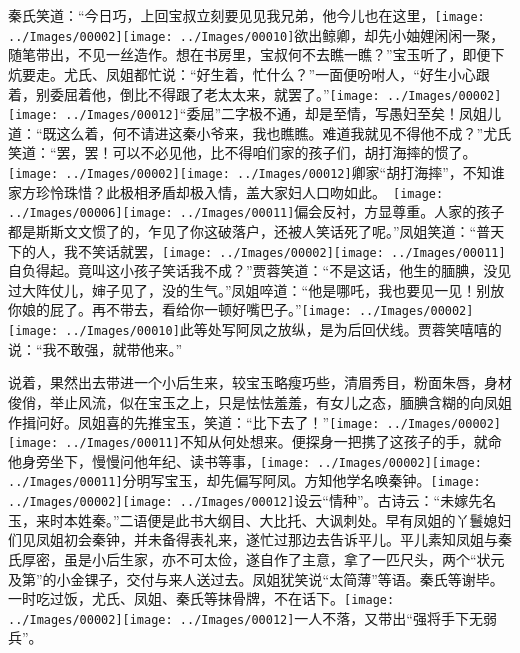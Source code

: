 秦氏笑道：``今日巧，上回宝叔立刻要见见我兄弟，他今儿也在这里，{\texttt{[image: ../Images/00002]}\texttt{[image: ../Images/00010]}\footnotesize \kaishu 欲出鲸卿，却先小妯娌闲闲一聚，随笔带出，不见一丝造作。}想在书房里，宝叔何不去瞧一瞧？''宝玉听了，即便下炕要走。尤氏、凤姐都忙说：``好生着，忙什么？''一面便吩咐人，``好生小心跟着，别委屈着他，倒比不得跟了老太太来，就罢了。''{\texttt{[image: ../Images/00002]}\texttt{[image: ../Images/00012]}\footnotesize \kaishu ``委屈''二字极不通，却是至情，写愚妇至矣！}凤姐儿道：``既这么着，何不请进这秦小爷来，我也瞧瞧。难道我就见不得他不成？''尤氏笑道：``罢，罢！可以不必见他，比不得咱们家的孩子们，胡打海摔的惯了。{{\texttt{[image: ../Images/00002]}\texttt{[image: ../Images/00012]}\footnotesize \kaishu 卿家``胡打海摔''，不知谁家方珍怜珠惜？此极相矛盾却极入情，盖大家妇人口吻如此。　}\texttt{[image: ../Images/00006]}\texttt{[image: ../Images/00011]}\footnotesize \kaishu 偏会反衬，方显尊重。}人家的孩子都是斯斯文文惯了的，乍见了你这破落户，还被人笑话死了呢。''凤姐笑道：``普天下的人，我不笑话就罢，{\texttt{[image: ../Images/00002]}\texttt{[image: ../Images/00011]}\footnotesize \kaishu 自负得起。}竟叫这小孩子笑话我不成？''贾蓉笑道：``不是这话，他生的腼腆，没见过大阵仗儿，婶子见了，没的生气。''凤姐啐道：``他是哪吒，我也要见一见！别放你娘的屁了。再不带去，看给你一顿好嘴巴子。''{\texttt{[image: ../Images/00002]}\texttt{[image: ../Images/00010]}\footnotesize \kaishu 此等处写阿凤之放纵，是为后回伏线。}贾蓉笑嘻嘻的说：``我不敢强，就带他来。''

说着，果然出去带进一个小后生来，较宝玉略瘦巧些，清眉秀目，粉面朱唇，身材俊俏，举止风流，似在宝玉之上，只是怯怯羞羞，有女儿之态，腼腆含糊的向凤姐作揖问好。凤姐喜的先推宝玉，笑道：``比下去了！''{\texttt{[image: ../Images/00002]}\texttt{[image: ../Images/00011]}\footnotesize \kaishu 不知从何处想来。}便探身一把携了这孩子的手，就命他身旁坐下，慢慢问他年纪、读书等事，{\texttt{[image: ../Images/00002]}\texttt{[image: ../Images/00011]}\footnotesize \kaishu 分明写宝玉，却先偏写阿凤。}方知他学名唤秦钟。{\texttt{[image: ../Images/00002]}\texttt{[image: ../Images/00012]}\footnotesize \kaishu 设云``情种''。古诗云：``未嫁先名玉，来时本姓秦。''二语便是此书大纲目、大比托、大讽刺处。}早有凤姐的丫鬟媳妇们见凤姐初会秦钟，并未备得表礼来，遂忙过那边去告诉平儿。平儿素知凤姐与秦氏厚密，虽是小后生家，亦不可太俭，遂自作了主意，拿了一匹尺头，两个``状元及第''的小金锞子，交付与来人送过去。凤姐犹笑说``太简薄''等语。秦氏等谢毕。一时吃过饭，尤氏、凤姐、秦氏等抹骨牌，不在话下。{\texttt{[image: ../Images/00002]}\texttt{[image: ../Images/00012]}\footnotesize \kaishu 一人不落，又带出``强将手下无弱兵''。}

